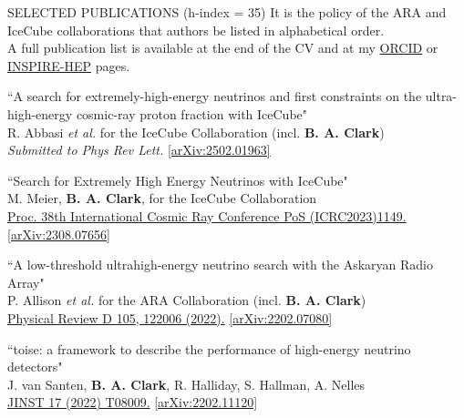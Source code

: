 \documentclass{resume} %
\begin{document}
\newpage
\begin{rSection}{SELECTED PUBLICATIONS (h-index = 35)}
  It is the policy of the ARA and IceCube collaborations that authors be listed in alphabetical order. \\  A full publication list is available at the end of the CV and at my \href{https://orcid.org/0000-0003-4089-2245}{ORCID}  or  \href{https://inspirehep.net/author/profile/Brian.A.Clark.1}{INSPIRE-HEP} pages.

\begin{etaremune}%

  \item ``A search for extremely-high-energy neutrinos and first constraints on the ultra-high-energy cosmic-ray proton fraction with IceCube" \\
R. Abbasi {\it et al.} for the IceCube Collaboration (incl. \textbf{B. A. Clark})\\ \textit{Submitted to Phys Rev Lett.} \href{https://arxiv.org/abs/2502.01963}{[arXiv:2502.01963]}

  \item ``Search for Extremely High Energy Neutrinos with IceCube" \\
 M. Meier, \textbf{B. A. Clark}, for the IceCube Collaboration \\ \href{https://doi.org/10.22323/1.444.1149}{Proc. 38th International Cosmic Ray Conference PoS (ICRC2023)1149.}  \href{https://arxiv.org/abs/2308.07656}{[arXiv:2308.07656]}

  \item ``A low-threshold ultrahigh-energy neutrino search with the Askaryan Radio Array" \\
 P. Allison {\it et al.} for the ARA Collaboration (incl. \textbf{B. A. Clark})\\ \href{https://doi.org/10.1103/PhysRevD.105.122006}{Physical Review D 105, 122006 (2022).}  \href{https://arxiv.org/abs/2202.07080}{[arXiv:2202.07080]}


  \item ``toise: a framework to describe the performance of high-energy neutrino detectors" \\
 J. van Santen, \textbf{B. A. Clark}, R. Halliday, S. Hallman, A. Nelles \\  \href{https://doi.org/10.1088/1748-0221/17/08/T08009}{JINST 17 (2022) T08009.}  \href{https://arxiv.org/abs/2202.11120}{[arXiv:2202.11120]}



\end{etaremune}
\end{rSection}
\end{document}
